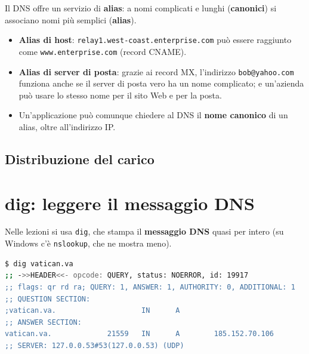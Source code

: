Il DNS offre un servizio di \textbf{alias}: a nomi complicati e lunghi (\textbf{canonici}) si associano nomi
più semplici (\textbf{alias}).

\begin{itemize}
    \item \textbf{Alias di host}: \texttt{relay1.west-coast.enterprise.com} può essere raggiunto come
          \texttt{www.enterprise.com} (record CNAME).
    \item \textbf{Alias di server di posta}: grazie ai record MX, l'indirizzo \texttt{bob@yahoo.com} funziona
          anche se il server di posta vero ha un nome complicato; e un'azienda può usare lo stesso nome per il
          sito Web e per la posta.
    \item Un'applicazione può comunque chiedere al DNS il \textbf{nome canonico} di un alias, oltre all'indirizzo IP.
\end{itemize}

\subsection{Distribuzione del carico}


\section{dig: leggere il messaggio DNS}

Nelle lezioni si usa \texttt{dig}, che stampa il \textbf{messaggio DNS} quasi per intero (su Windows c'è
\texttt{nslookup}, che ne mostra meno).

\begin{lstlisting}[language=bash]
$ dig vatican.va
;; ->>HEADER<<- opcode: QUERY, status: NOERROR, id: 19917
;; flags: qr rd ra; QUERY: 1, ANSWER: 1, AUTHORITY: 0, ADDITIONAL: 1
;; QUESTION SECTION:
;vatican.va.                    IN      A
;; ANSWER SECTION:
vatican.va.             21559   IN      A        185.152.70.106
;; SERVER: 127.0.0.53#53(127.0.0.53) (UDP)
\end{lstlisting}

